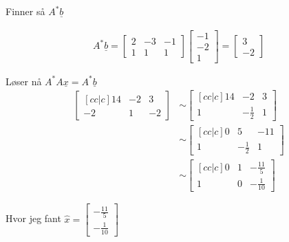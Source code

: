 \documentclass[11pt, a4paper, norsk]{NTNUoving}
\begin{document}
\begin{oppgave}
\begin{punkt}
           Finner så $A^{*}\underline{b}$

           \begin{align*}
               A^{*}\underline{b} = \begin{bmatrix}
                   2 & -3 & -1 \\
                   1 & 1 & 1
               \end{bmatrix}\begin{bmatrix}
                    -1 \\
                    -2 \\
                    1
               \end{bmatrix} = \begin{bmatrix}
                   3 \\
                   -2
               \end{bmatrix}
           \end{align*}
           
           Løser nå $A^{*}A\underline{x} = A^{*}\underline{b}$
           \begin{align*}
               \begin{bmatrix}[cc|c]
                   14 & -2 & 3 \\
                   -2 & 1 & -2
                   \end{bmatrix} &\sim \begin{bmatrix}[cc|c]
               14 & -2 & 3 \\
               1 & -\frac{1}{2} & 1
               \end{bmatrix}
               \\
               &\sim \begin{bmatrix}[cc|c]
                   0 & 5 & -11 \\
                   1 & -\frac{1}{2} & 1
               \end{bmatrix}
               \\
               &\sim \begin{bmatrix}[cc|c]
                   0 & 1 & -\frac{11}{5}\\
                   1 & 0 & -\frac{1}{10}
               \end{bmatrix}
           \end{align*}
           
           Hvor jeg fant $\hat{x} = \begin{bmatrix}
               -\frac{11}{5} \\
               -\frac{1}{10}
           \end{bmatrix}$


\end{punkt}
\end{oppgave}
\end{document}

